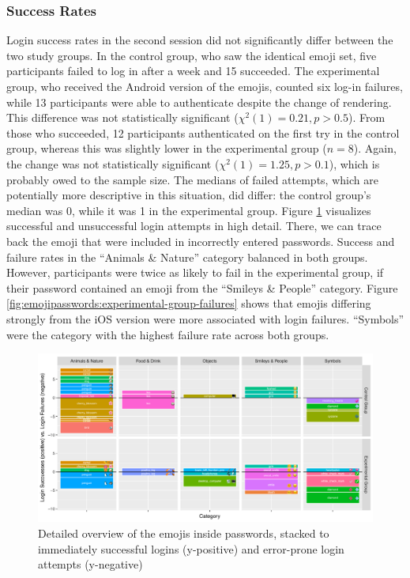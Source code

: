 \subsubsection{Success Rates}
Login success rates in the second session did not significantly differ between the two study groups. In the control group, who saw the identical emoji set, five participants failed to log in after a week and 15 succeeded. The experimental group, who received the Android version of the emojis, counted six log-in failures, while 13 participants were able to authenticate despite the change of rendering. This difference was not statistically significant ($\chi^2(1)=0.21, p>0.5$). From those who succeeded, 12 participants authenticated on the first try in the control group, whereas this was slightly lower in the experimental group ($n=8$). Again, the change was not statistically significant ($\chi^2(1)=1.25, p>0.1$), which is probably owed to the sample size. The medians of failed attempts, which are potentially more descriptive in this situation, did differ: the control group's median was 0, while it was 1 in the experimental group. Figure \ref{fig:emojipasswords:success-vs-failures} visualizes successful and unsuccessful login attempts in high detail. There, we can trace back the emoji that were included in incorrectly entered passwords. Success and failure rates in the ``Animals \& Nature'' category balanced in both groups. However, participants were twice as likely to fail in the experimental group, if their password contained an emoji from the ``Smileys \& People'' category. Figure \ref{fig:emojipasswords:experimental-group-failures} shows that emojis differing strongly from the iOS version were more associated with login failures. ``Symbols'' were the category with the highest failure rate across both groups.


\begin{figure}
	\centering
	\includegraphics[width=\linewidth]{figures/emojipasswords/success-vs-failures}
	\caption{
		\label{fig:emojipasswords:success-vs-failures}
		Detailed overview of the emojis inside passwords, stacked to immediately successful logins (y-positive) and error-prone login attempts (y-negative)
	}
\end{figure}

